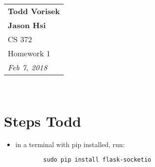 \documentclass{article}
\begin{document}
  \null\hfill
  \begin{tabular}[t]{l@{}}
    \textbf{Todd Vorisek}\\
    \textbf{Jason Hsi} \\
    CS 372 \\
    Homework 1\\
    \textit{Feb 7, 2018} \\
  \end{tabular}\\

  \section*{Steps Todd}
    \begin{itemize}
      \item in a terminal with pip installed, run: \begin{lstlisting}
        sudo pip install flask-socketio \end{lstlisting}
    \end{itemize}
\end{document}
